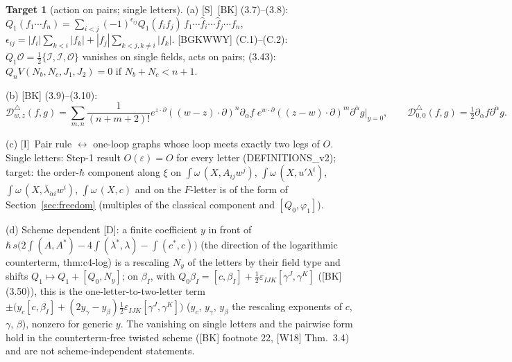\documentclass[11pt]{article}
\theoremstyle{definition}
\newtheorem{target}{Target}
\newcommand{\Sl}{\textup{[S]}}
\newcommand{\Dl}{\textup{[D]}}
\newcommand{\Il}{\textup{[I]}}
\begin{document}
\begin{target}[action on pairs; single letters]\label{t:pairs}
(a) \Sl\ [BK] (3.7)--(3.8): $Q_1(f_1\cdots f_n)=\sum_{i<j}(-1)^{\epsilon_{ij}}Q_1(f_if_j)\,f_1\cdots\hat f_i\cdots\hat f_j\cdots f_n$, $\epsilon_{ij}=|f_i|\sum_{k<i}|f_k|+|f_j|\sum_{k<j,k\ne i}|f_k|$. [BGKWWY] (C.1)--(C.2): $Q_1\mathcal O=\frac12\{\mathcal I,\mathcal I,\mathcal O\}$ vanishes on single fields, acts on pairs; (3.43): $Q_nV(N_b,N_c,J_1,J_2)=0$ if $N_b+N_c<n+1$.

(b) [BK] (3.9)--(3.10):
\[
\mathcal D^\triangle_{w,z}(f,g)=\sum_{m,n}\frac1{(n+m+2)!}e^{z\cdot\partial}((w-z)\cdot\partial)^n\partial_{\dot\alpha}f\;e^{w\cdot\partial}((z-w)\cdot\partial)^m\partial^{\dot\alpha}g\Big|_{y=0},\qquad \mathcal D^\triangle_{0,0}(f,g)=\tfrac12\partial_{\dot\alpha}f\partial^{\dot\alpha}g .
\]

(c) \Il\ Pair rule $\leftrightarrow$ one-loop graphs whose loop meets exactly two legs of $O$. Single letters: Step-1 result $O(\varepsilon)=O$ for every letter (DEFINITIONS\_v2); target: the order-$\hbar$ component along $\xi$ on $\int\omega\,(X,A_{ij}w^j)$, $\int\omega\,(X,u'\lambda^i)$, $\int\omega\,(X,\bar\lambda_{\dot\alpha i}w^i)$, $\int\omega\,(X,c)$ and on the $F$-letter is of the form of Section~\ref{sec:freedom} (multiples of the classical component and $[Q_0,\varphi_1]$).

(d) Scheme dependent \Dl: a finite coefficient $y$ in front of $\hbar\,s\big(2\!\int\!(A,A^*)-4\!\int\!(\lambda^*,\lambda)-\!\int\!(c^*,c)\big)$ (the direction of the logarithmic counterterm, thm:c4-log) is a rescaling $N_y$ of the letters by their field type and shifts $Q_1\mapsto Q_1+[Q_0,N_y]$; on $\beta_I$, with $Q_0\beta_I=[c,\beta_I]+\frac12\varepsilon_{IJK}[\gamma^J,\gamma^K]$ ([BK] (3.50)), this is the one-letter-to-two-letter term $\pm\big(y_c[c,\beta_I]+(2y_\gamma-y_\beta)\tfrac12\varepsilon_{IJK}[\gamma^J,\gamma^K]\big)$ ($y_c$, $y_\gamma$, $y_\beta$ the rescaling exponents of $c$, $\gamma$, $\beta$), nonzero for generic $y$. The vanishing on single letters and the pairwise form hold in the counterterm-free twisted scheme ([BK] footnote 22, [W18] Thm.~3.4) and are not scheme-independent statements.
\end{target}
\end{document}
